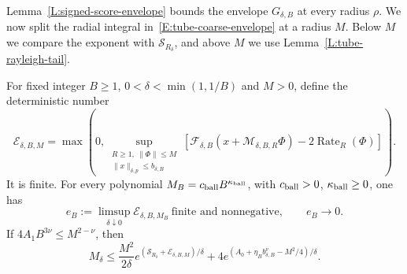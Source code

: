 Lemma~\ref{L:signed-score-envelope} bounds the envelope $G_{\delta,B}$ at every
radius $\rho$. We now split the radial integral
in~\eqref{E:tube-coarse-envelope} at a radius $M$. Below $M$ we compare the
exponent with $\mathcal{S}_{R_\delta}$, and above $M$ we use
Lemma~\ref{L:tube-rayleigh-tail}.

\begin{proposition}
  \label{P:signed-moment-bulk-tail}
  For fixed integer $B \ge 1$, $0 < \delta < \min(1,1/B)$ and $M > 0$, define
  the deterministic number
  \[
    \mathcal{E}_{\delta,B,M}=
    \max\left(0,\sup_{\substack{R\ge1,\ \|\Phi\|\le M\\
    \|x\|_{\delta,p}\le b_{\delta,B}}}
    [\mathcal{F}_{\delta,B}(x+\mathcal{M}_{\delta,B,R}\Phi)
    -2\operatorname{Rate}_R(\Phi)]\right).
  \]
  It is finite. For every polynomial $M_B = c_{\rm ball}B^{\kappa_{\rm ball}}$,
  with $c_{\rm ball} > 0$, $\kappa_{\rm ball} \ge 0$, one has
  \begin{equation}\label{E:signed-error-limit}
    e_B:=\limsup_{\delta\downarrow0}\mathcal{E}_{\delta,B,M_B}
    \ \text{finite and nonnegative},\qquad e_B\longrightarrow0 .
  \end{equation}
  If $4A_1B^{3\nu} \le M^{2-\nu}$, then
  \begin{equation}\label{E:signed-finite-moment}
    M_\delta\le
    \frac{M^2}{2\delta}
    e^{(\mathcal{S}_{R_\delta}+\mathcal{E}_{\delta,B,M})/\delta}
    +4e^{(A_0+\eta_Bb_{\delta,B}^\nu-M^2/4)/\delta}.
  \end{equation}
\end{proposition}

